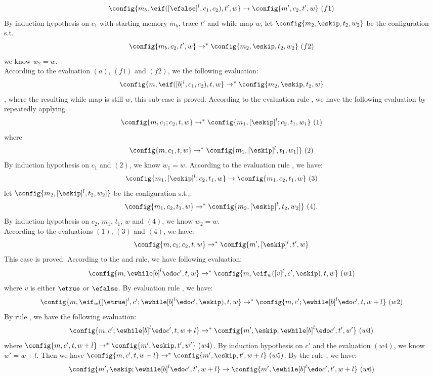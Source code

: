 {\begin{subproof}
\[
\config{m_b, \eif([\efalse]^l, c_1, c_2), t', w} \to \config{m', c_2, t', w} ~ (f1)
\]
%
By induction hypothesis on $c_1$ with starting memory $m_b$, trace $t'$ and while map $w$, 
let $\config{m_2, \eskip, t_2, w_2}$ be the configuration s.t.
\[
	\config{m_b, c_2, t', w} \to^{*} \config{m_2, \eskip, t_2, w_2} ~(f2)
\]
we know $w_2 = w$.
\\
According to the evaluation $(a)$, $(f1)$ and $(f2)$, we the following evaluation:
\[
	\config{m, \eif([b]^l, c_1, c_2), t, w} \to^{*} \config{m_2, \eskip, t_2, w}
\]
%
, where the resulting while map is still $w$, this sub-case is proved.
%
%
According to the evaluation rule , we have the following evaluation by repeatedly applying  
%
\[
\config{m, c_1;c_2, t, w} \to^{*} \config{m_1, [\eskip]^l;c_2,  t_1, w_1} ~ (1)
\]
%
where 
%
\[
	\config{m, c_1, t, w} \to^{*} \config{m_1, [\eskip]^l, t_1, w_1]} ~ (2)
\]
%
By induction hypothesis on $c_1$ and $(2)$, we know $w_1 = w$.
%
According to the evaluation rule , we have:
%
\[
\config{m_1, [\eskip]^l;c_2,  t_1, w} \to \config{m_1, c_2, t_1, w} ~ (3)
\]
%
let $\config{m_2, [\eskip]^l, t_2, w_2]}$ be the configuration s.t.,:
%
\[
	\config{m_1, c_2, t_1, w} \to^{*} \config{m_2, [\eskip]^l, t_2, w_2]}~ (4).
\]
%
%
By induction hypothesis on $c_2$, $m_1$, $t_1$, $w$ and $(4)$, we know $w_2 = w$.
%
\\
According to the evaluations $(1)$, $(3)$ and $(4)$, we have:
\[
	\config{m, c_1;c_2, t, w} \to^{*} \config{m', [\eskip]^l, t', w}
\]
%
This case is proved.
%
%
According to the  and  rule, we have following evaluation:
\[
	\config{m, \ewhile [b]^l \edo c', t, w} \to^{*}
	\config{m, \eif_w([v]^l, c', \eskip), t, w} ~ (w1)
\]
%
where $v$ is either $\etrue$ or $\efalse$.
%
%
By evaluation rule , we have:
%
\[
	\config{m, \eif_w([\etrue]^l, c';\ewhile [b]^l \edo c', \eskip), t, w} 
	\to^{*} \config{m, c';\ewhile [b]^l \edo c', t, w+l} ~ (w2)
\]
%
By rule , we have the following evaluation:
%
\[
	\config{m, c';\ewhile [b]^l \edo c', t, w+l} \to^{*} \config{m', \eskip;\ewhile [b]^l \edo c', t', w'} ~ (w3)
\] 
%
where $\config{m, c', t, w+l} \to^{*} \config{m', \eskip, t', w'} ~ (w4)$. 
%
By induction hypothesis on $c'$ and the evaluation $(w4)$, we know $w' = w + l$. Then we have $\config{m, c', t, w+l} \to^{*} \config{m', \eskip, t', w+l} ~ (w5)$.
%
By the rule , we have:
%
\[
	\config{m', \eskip;\ewhile [b]^l \edo c', t', w + l} \to \config{m', \ewhile [b]^l \edo c', t', w + l} ~ (w6)
\]
\end{subproof}}
